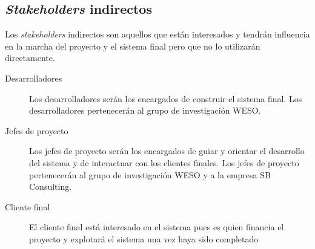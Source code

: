 \subsection{\textit{Stakeholders} indirectos}
Los \textit{stakeholders} indirectos son aquellos que están interesados y tendrán influencia en la marcha del proyecto y el sistema final pero que no lo utilizarán directamente.

\begin{description}
\item[Desarrolladores]  Los desarrolladores serán los encargados de construir el sistema final.  Los desarrolladores pertenecerán al grupo de investigación WESO.
\item[Jefes de proyecto]  Los jefes de proyecto serán los encargados de guiar y orientar el desarrollo del sistema y de interactuar con los clientes finales.  Los jefes de proyecto pertenecerán al grupo de investigación WESO y a la empresa SB Consulting.
\item[Cliente final]  El cliente final está interesado en el sistema pues es quien financia el proyecto y explotará el sistema una vez haya sido completado
\end{description}